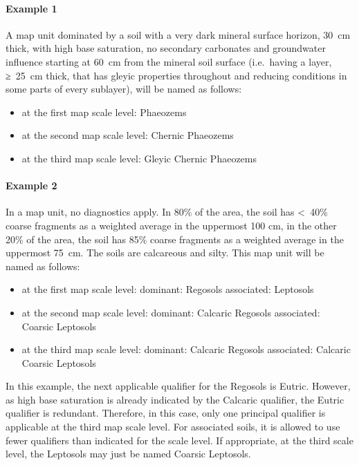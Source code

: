 \documentclass[
  letterpaper,
  DIV=11,
  numbers=noendperiod]{scrreprt}
\let\oldparagraph\paragraph
\renewcommand{\paragraph}[1]{\oldparagraph{#1}\mbox{}}
\providecommand{\tightlist}{%
  \setlength{\itemsep}{0pt}\setlength{\parskip}{0pt}}\usepackage{longtable,booktabs,array}
\begin{document}
\hypertarget{example-1}{%
\paragraph{Example 1}\label{example-1}}

A map unit dominated by a soil with a very dark mineral surface horizon,
30~cm thick, with high base saturation, no secondary carbonates and
groundwater influence starting at 60~cm from the mineral soil surface
(i.e.~having a layer, ≥~25~cm thick, that has gleyic properties
throughout and reducing conditions in some parts of every sublayer),
will be named as follows:

\begin{itemize}
\tightlist
\item
  at the first map scale level: Phaeozems
\item
  at the second map scale level: Chernic Phaeozems
\item
  at the third map scale level: Gleyic Chernic Phaeozems
\end{itemize}

\hypertarget{example-2}{%
\paragraph{Example 2}\label{example-2}}

In a map unit, no diagnostics apply. In 80\% of the area, the soil has
\textless~40\% coarse fragments as a weighted average in the uppermost
100 cm, in the other 20\% of the area, the soil has 85\% coarse
fragments as a weighted average in the uppermost 75~cm. The soils are
calcareous and silty. This map unit will be named as follows:

\begin{itemize}
\item
  at the first map scale level: dominant: Regosols associated: Leptosols
\item
  at the second map scale level: dominant: Calcaric Regosols associated:
  Coarsic Leptosols
\item
  at the third map scale level: dominant: Calcaric Regosols associated:
  Calcaric Coarsic Leptosols
\end{itemize}

In this example, the next applicable qualifier for the Regosols is
Eutric. However, as high base saturation is already indicated by the
Calcaric qualifier, the Eutric qualifier is redundant. Therefore, in
this case, only one principal qualifier is applicable at the third map
scale level. For associated soils, it is allowed to use fewer qualifiers
than indicated for the scale level. If appropriate, at the third scale
level, the Leptosols may just be named Coarsic Leptosols.
\end{document}
